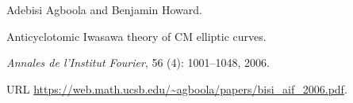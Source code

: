 Adebisi Agboola and Benjamin Howard.

\newblock Anticyclotomic {Iwasawa} theory of {CM} elliptic curves.

\newblock \emph{Annales de l'Institut Fourier}, 56 (4):
  1001--1048, 2006.

\newblock URL
  \url{https://web.math.ucsb.edu/~agboola/papers/bisi_aif_2006.pdf}.
